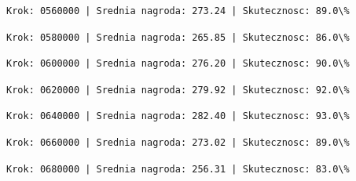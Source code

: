 \documentclass[11pt]{article}
\begin{document}
    
    
    \begin{Verbatim}[commandchars=\\\{\}]
Krok: 0560000 | Srednia nagroda: 273.24 | Skutecznosc: 89.0\%

    \end{Verbatim}

    
    
    \begin{Verbatim}[commandchars=\\\{\}]
Krok: 0580000 | Srednia nagroda: 265.85 | Skutecznosc: 86.0\%

    \end{Verbatim}

    
    
    \begin{Verbatim}[commandchars=\\\{\}]
Krok: 0600000 | Srednia nagroda: 276.20 | Skutecznosc: 90.0\%

    \end{Verbatim}

    
    
    \begin{Verbatim}[commandchars=\\\{\}]
Krok: 0620000 | Srednia nagroda: 279.92 | Skutecznosc: 92.0\%

    \end{Verbatim}

    
    
    \begin{Verbatim}[commandchars=\\\{\}]
Krok: 0640000 | Srednia nagroda: 282.40 | Skutecznosc: 93.0\%

    \end{Verbatim}

    
    
    \begin{Verbatim}[commandchars=\\\{\}]
Krok: 0660000 | Srednia nagroda: 273.02 | Skutecznosc: 89.0\%

    \end{Verbatim}

    
    
    \begin{Verbatim}[commandchars=\\\{\}]
Krok: 0680000 | Srednia nagroda: 256.31 | Skutecznosc: 83.0\%

    \end{Verbatim}
\end{document}
